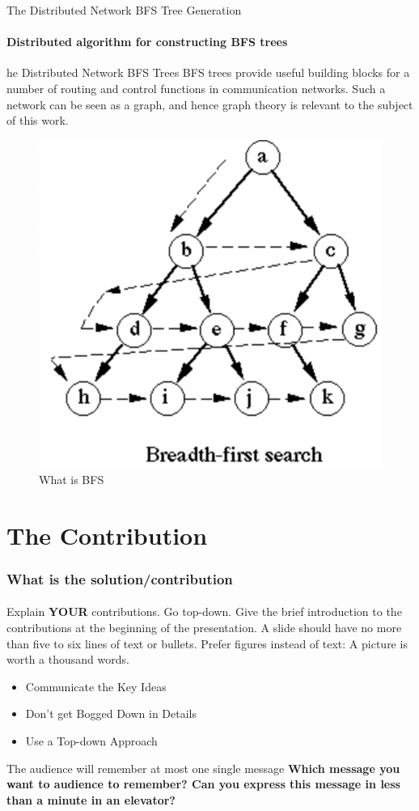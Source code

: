\documentclass[11pt]{beamer}              %
\begin{document}
\begin{frame}{The Distributed Network BFS Tree Generation}
\framesubtitle{Distributed algorithm for constructing BFS trees}
\begin{block}{he Distributed Network BFS Trees} 
BFS trees provide useful building blocks for a number of routing and control functions in communication networks. Such a network can be seen as a graph, and hence graph theory is relevant to the subject of this work. 
\begin{figure}
    \centering
    \includegraphics[scale=0.5]{figures/bfs.png}
    \caption{What is BFS}
    \label{fig:BFS_IMAGE}
\end{figure}
\end{block}
\note{}
\end{frame}

\section{The Contribution}
\begin{frame}
\frametitle{What is the solution/contribution}
\framesubtitle{}
Explain \textbf{YOUR} contributions. Go top-down. Give the brief introduction to the contributions at the beginning of the presentation. A slide should have no more than five to six lines of text or bullets. Prefer figures instead of text: A picture is worth a thousand words.
\begin{itemize}
\item Communicate the Key Ideas
\item Don’t get Bogged Down in Details
\item Use a Top-down Approach
\end{itemize}

The audience will remember at most one single message \textbf{Which message you want to audience to remember? Can you express this message in less than a minute in an elevator?}

\end{frame}
\end{document}
